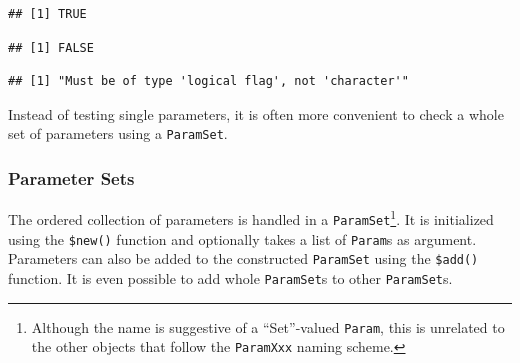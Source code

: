 \documentclass[]{scrbook}
\newenvironment{Shaded}{\begin{snugshade}}{\end{snugshade}}
\newcommand{\KeywordTok}[1]{\textcolor[rgb]{0.13,0.29,0.53}{\textbf{#1}}}
\newcommand{\NormalTok}[1]{#1}
\newcommand{\OperatorTok}[1]{\textcolor[rgb]{0.81,0.36,0.00}{\textbf{#1}}}
\newcommand{\StringTok}[1]{\textcolor[rgb]{0.31,0.60,0.02}{#1}}
\renewenvironment{Shaded} {\begin{snugshade}\small} {\end{snugshade}}
\begin{document}
\begin{verbatim}
## [1] TRUE
\end{verbatim}

\begin{Shaded}
\end{Shaded}

\begin{verbatim}
## [1] FALSE
\end{verbatim}

\begin{Shaded}
\end{Shaded}

\begin{verbatim}
## [1] "Must be of type 'logical flag', not 'character'"
\end{verbatim}

Instead of testing single parameters, it is often more convenient to check a whole set of parameters using a \texttt{ParamSet}.

\hypertarget{parameter-sets}{%
\subsubsection{Parameter Sets}\label{parameter-sets}}

The ordered collection of parameters is handled in a \texttt{ParamSet}\footnote{Although the name is suggestive of a ``Set''-valued \texttt{Param}, this is unrelated to the other objects that follow the \texttt{ParamXxx} naming scheme.}.
It is initialized using the \texttt{\$new()} function and optionally takes a list of \texttt{Param}s as argument.
Parameters can also be added to the constructed \texttt{ParamSet} using the \texttt{\$add()} function.
It is even possible to add whole \texttt{ParamSet}s to other \texttt{ParamSet}s.

\begin{Shaded}
\end{Shaded}
\end{document}
